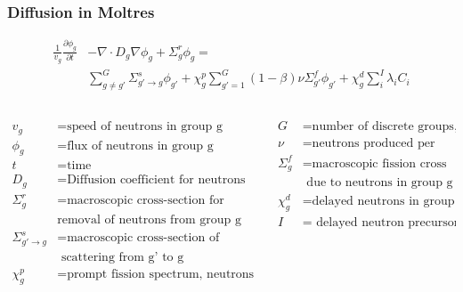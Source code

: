 \begin{frame}
        \frametitle{Diffusion in Moltres}
        \footnotesize{
        \begin{align}
        \frac{1}{v_g}\frac{\partial \phi_g}{\partial t} &- \nabla \cdot D_g
        \nabla \phi_g + \Sigma_g^r \phi_g =\\
                &\sum_{g \ne g'}^G \Sigma_{g'\rightarrow g}^s \phi_{g'} + \chi_g^p \sum_{g' = 1}^G (1 -
        \beta) \nu \Sigma_{g'}^f \phi_{g'} + \chi_g^d \sum_i^I \lambda_i C_i
        \end{align}}
\begin{columns}
    \begin{column}{0.48\textwidth}
        \footnotesize{
        \begin{align*}
                v_g &= \mbox{speed of neutrons in group g} \\
                \phi_g &= \mbox{flux of neutrons in group g} \\
                t &= \mbox{time} \\
                D_g &= \mbox{Diffusion coefficient for neutrons in group g} \\
                \Sigma_g^r &= \mbox{macroscopic cross-section for}\\
                &\mbox{removal of neutrons from group g} \\
                \Sigma_{g'\rightarrow g}^s &= \mbox{macroscopic cross-section 
                of}\\
                &\mbox{  scattering from g' to g} \\
                \chi_g^p &= \mbox{prompt fission spectrum, neutrons in group g} \\
        \end{align*}}
    \end{column}
    \begin{column}{0.48\textwidth}
        \footnotesize{
        \begin{align*}
                G &= \mbox{number of discrete groups, g} \\
                \nu &= \mbox{neutrons produced per fission} \\
                \Sigma_g^f &= \mbox{macroscopic fission cross section}\\
                &\mbox{ due to neutrons in group g} \\
                \chi_g^d &= \mbox{delayed neutrons in group g} \\
                I &= \mbox{ delayed neutron precursor groups} \\

\end{align*}}
\end{column}
\end{columns}
\end{frame}
